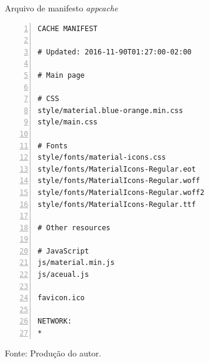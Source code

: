 \begin{quadro}[h]
\centering
  \caption{Arquivo de manifesto \textit{appcache}}\label{qua:cache-appcache}
\begin{lstlisting}[numbers=left,frame=single]
CACHE MANIFEST

# Updated: 2016-11-90T01:27:00-02:00

# Main page

# CSS
style/material.blue-orange.min.css
style/main.css

# Fonts
style/fonts/material-icons.css
style/fonts/MaterialIcons-Regular.eot
style/fonts/MaterialIcons-Regular.woff
style/fonts/MaterialIcons-Regular.woff2
style/fonts/MaterialIcons-Regular.ttf

# Other resources

# JavaScript
js/material.min.js
js/aceual.js

favicon.ico

NETWORK:
*

\end{lstlisting}
  \caption*{\ifdraft{\color{green}}{}\footnotesize Fonte: Produção do autor.}
\end{quadro}

\ifdraft{}{

%
%
%
%
%
%
%
%
%
}
